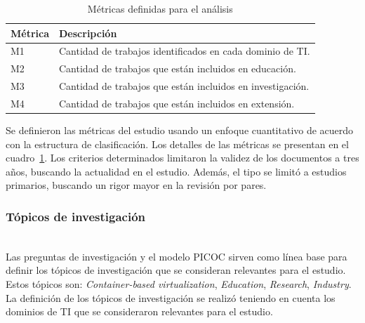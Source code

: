 \begin{table}[htbp]
\centering
\renewcommand{\arraystretch}{1.3}
\begin{tabularx}{\columnwidth}{>{\centering\arraybackslash}m{} >{\RaggedRight\arraybackslash}X}
\toprule
\textbf{Métrica} & \textbf{Descripción} \\
\midrule
M1 & Cantidad de trabajos identificados en cada dominio de TI. \\
M2 & Cantidad de trabajos que están incluidos en educación. \\
M3 & Cantidad de trabajos que están incluidos en investigación. \\
M4 & Cantidad de trabajos que están incluidos en extensión. \\
\bottomrule
\end{tabularx}
\caption{Métricas definidas para el análisis}\label{tab:metricas}
\end{table}

Se definieron las métricas del estudio usando un enfoque cuantitativo de acuerdo con la estructura de clasificación. Los detalles de las métricas se presentan en el cuadro~\ref{tab:metricas}.
Los criterios determinados limitaron la validez de los documentos a tres años, buscando la actualidad en el estudio. Además, el tipo se limitó a estudios primarios, buscando un rigor mayor en la revisión por pares.\\

\subsubsection{Tópicos de investigación}
\mbox{}\\
Las preguntas de investigación y el modelo PICOC sirven como línea base para definir los tópicos de investigación que se consideran relevantes para el estudio. Estos tópicos son: \textit{Container-based virtualization}, \textit{Education}, \textit{Research}, \textit{Industry}. 
La definición de los tópicos de investigación se realizó teniendo en cuenta los dominios de TI que se consideraron relevantes para el estudio.\\

